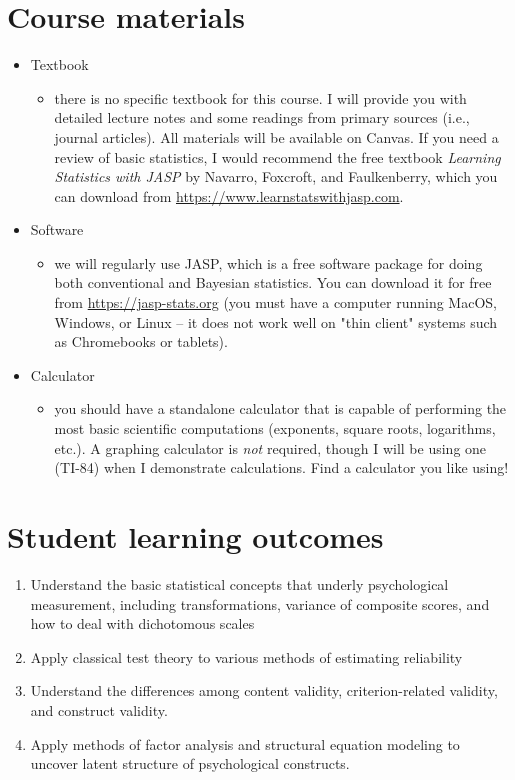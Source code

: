 \documentclass[10pt]{article}
\begin{document}
\section*{Course materials}
\label{sec:org0010cbb}
\begin{itemize}
\item Textbook
\begin{itemize}
\item there is no specific textbook for this course. I will provide you with detailed lecture notes and some readings from primary sources (i.e., journal articles). All materials will be available on Canvas. If you need a review of basic statistics, I would recommend the free textbook \emph{Learning Statistics with JASP} by Navarro, Foxcroft, and Faulkenberry, which you can download from \url{https://www.learnstatswithjasp.com}.
\end{itemize}
\item Software
\begin{itemize}
\item we will regularly use JASP, which is a free software package for doing both conventional and Bayesian statistics. You can download it for free from \url{https://jasp-stats.org} (you must have a computer running MacOS, Windows, or Linux -- it does not work well on "thin client" systems such as Chromebooks or tablets).
\end{itemize}
\item Calculator
\begin{itemize}
\item you should have a standalone calculator that is capable of performing the most basic scientific computations (exponents, square roots, logarithms, etc.). A graphing calculator is \emph{not} required, though I will be using one (TI-84) when I demonstrate calculations. Find a calculator you like using!
\end{itemize}
\end{itemize}

\section*{Student learning outcomes}
\label{sec:org40da21e}
\begin{enumerate}
\item Understand the basic statistical concepts that underly psychological measurement, including transformations, variance of composite scores, and how to deal with dichotomous scales
\item Apply classical test theory to various methods of estimating reliability
\item Understand the differences among content validity, criterion-related validity, and construct validity.
\item Apply methods of factor analysis and structural equation modeling to uncover latent structure of psychological constructs.
\end{enumerate}
\end{document}
